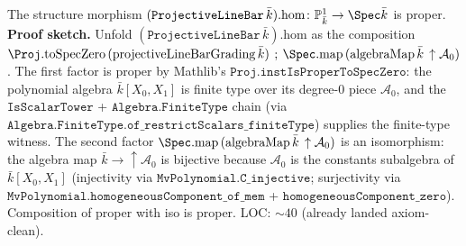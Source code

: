 \begin{lemma}
  \label{lem:projectiveLineBar_isProper}
  The structure morphism \((\mathtt{ProjectiveLineBar}\,\bar k).\mathrm{hom}
  \colon \mathbb P^1_{\bar k} \to \Spec \bar k\) is proper.
  \medskip
  \noindent\textbf{Proof sketch.} Unfold \((\mathtt{ProjectiveLineBar}\,\bar k)
  .\mathrm{hom}\) as the composition
  \(\Proj.\mathrm{toSpecZero}\,(\mathrm{projectiveLineBarGrading}\,\bar k)
  \fatsemi \Spec.\mathrm{map}\,(\mathrm{algebraMap}\,\bar k\,
  \uparrow{\mathcal A_0})\). The first factor is proper by Mathlib's
  \(\mathtt{Proj.instIsProperToSpecZero}\): the polynomial algebra
  \(\bar k[X_0, X_1]\) is finite type over its degree-\(0\) piece
  \(\mathcal A_0\), and the \(\mathtt{IsScalarTower}\) +
  \(\mathtt{Algebra.FiniteType}\) chain (via
  \(\mathtt{Algebra.FiniteType.of\_restrictScalars\_finiteType}\)) supplies the
  finite-type witness. The second factor \(\Spec.\mathrm{map}\,(\mathrm{algebraMap}
  \,\bar k\,\uparrow{\mathcal A_0})\) is an isomorphism: the algebra map
  \(\bar k \to \uparrow{\mathcal A_0}\) is bijective because \(\mathcal A_0\)
  is the constants subalgebra of \(\bar k[X_0, X_1]\) (injectivity via
  \(\mathtt{MvPolynomial.C\_injective}\); surjectivity via
  \(\mathtt{MvPolynomial.homogeneousComponent\_of\_mem}\) +
  \(\mathtt{homogeneousComponent\_zero}\)). Composition of proper with iso is
  proper. LOC: \(\sim 40\) (already landed axiom-clean).
\end{lemma}
